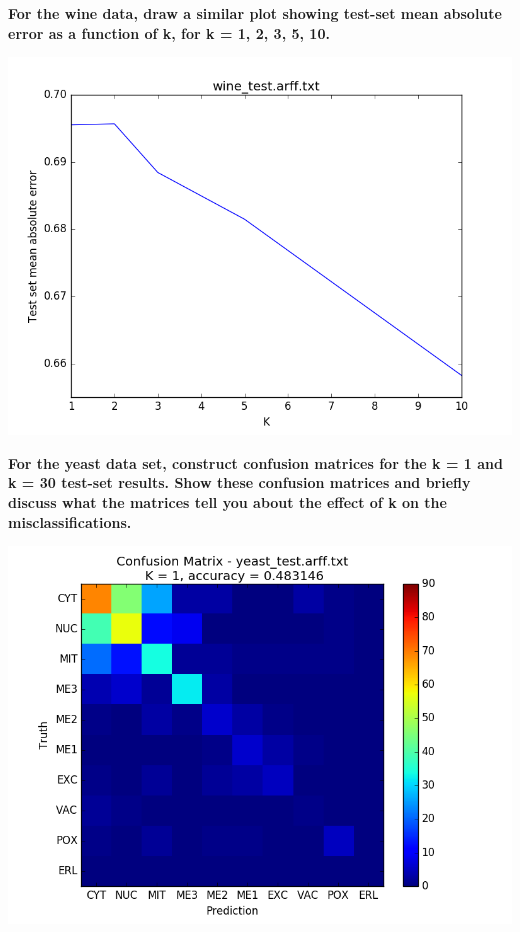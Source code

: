 \documentclass[paper=a4, fontsize=11pt]{scrartcl} %
\numberwithin{equation}{section} %
\numberwithin{figure}{section} %
\numberwithin{table}{section} %
\begin{document}
\textbf{For the wine data, draw a similar plot showing test-set mean absolute error as a function of k, for k = 1, 2, 3, 5, 10.}
\begin{center}
\includegraphics[scale=.55]{pics/hw2_2_2.png}
\end{center}


\newpage
\textbf{For the yeast data set, construct confusion matrices for the k = 1 and k = 30 test-set results. Show these confusion matrices and briefly discuss what the matrices tell you about the effect of k on the misclassifications.}

\begin{center}
\includegraphics[scale=.6]{pics/hw2_2_3_1.png}
\end{center}
\end{document}
